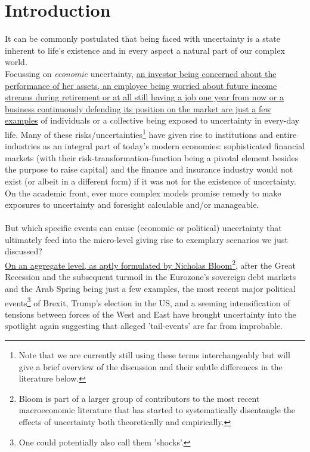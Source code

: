 \documentclass[a4paper,12pt,oneside,pointednumbers,bibtotoc,bigheadings,liststotoc]{scrbook}
\begin{document}
\chapter{Introduction}
It can be commonly postulated that being faced with uncertainty is a state inherent to life's existence and in every aspect a natural part of our complex world. \\
Focussing on \textit{economic} uncertainty, \href{http://citeseerx.ist.psu.edu/viewdoc/download?doi=10.1.1.334.4248&rep=rep1&type=pdf}{an investor being concerned about the performance of her assets, an employee being worried about future income streams during retirement or at all still having a job one year from now or a business continuously defending its position on the market are just a few examples} of individuals or a collective being exposed to uncertainty in every-day life. Many of these risks/uncertainties\footnote{Note that we are currently still using these terms interchangeably but will give a brief overview of the discussion and their subtle differences in the literature below.} have given rise to institutions and entire industries as an integral part of today's modern economies: sophisticated financial markets (with their risk-transformation-function being a pivotal element besides the purpose to raise capital) and the finance and insurance industry would not exist (or albeit in a different form) if it was not for the existence of uncertainty. On the academic front, ever more complex models promise remedy to make exposures to uncertainty and foresight calculable and/or manageable.\\
\\
But which specific events can cause (economic or political) uncertainty that ultimately feed  into the micro-level giving rise to exemplary scenarios we just discussed?\\
\href{https://site.stanford.edu/2018/session-6}{On an aggregate level, as aptly formulated by Nicholas Bloom}\footnote{Bloom is part of a larger group of contributors to the most recent macroeconomic literature that has started to systematically disentangle the effects of uncertainty both theoretically and empirically.}, after the Great Recession and the subsequent turmoil in the Eurozone's sovereign debt markets and the Arab Spring being just a few examples, the most recent major political events\footnote{One could potentially also call them 'shocks'.} of Brexit, Trump's election in the US,  and a seeming intensification of tensions between forces of the West and East have brought uncertainty into the spotlight again suggesting that alleged 'tail-events' are far from improbable.\\
\end{document}

